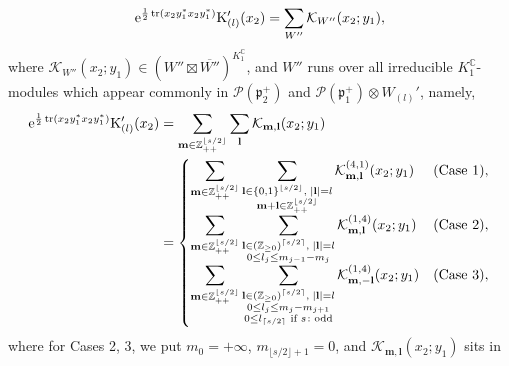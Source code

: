 \documentclass[pdftex]{sigma}
\numberwithin{equation}{section}
\newcommand{\ds}{\displaystyle}
\newcommand{\bl}{\mathbf{l}}
\newcommand{\bm}{\mathbf{m}}
\newcommand{\BZ}{\mathbb{Z}}
\newcommand{\BC}{\mathbb{C}}
\newcommand{\fp}{\mathfrak{p}}
\newcommand{\cK}{\mathcal{K}}
\newcommand{\cP}{\mathcal{P}}
\newcommand{\rK}{\mathrm{K}}
\newcommand{\tr}{\operatorname{tr}}
\begin{document}
\begin{gather*} {\rm e}^{\frac{1}{2}\tr(x_2y_1^*x_2y_1^*)}\rK_{(l)}'(x_2)=\sum_{W''} \cK_{W''}(x_2;y_1), \end{gather*}
where $\cK_{W''}(x_2;y_1)\in (W''\boxtimes \overline{W''})^{K_1^\BC}$, and $W''$ runs over all irreducible $K_1^\BC$-modules
which appear commonly in $\cP(\fp^+_2)$ and $\cP(\fp^+_1)\otimes W_{(l)}'$, namely,
\begin{align}
{\rm e}^{\frac{1}{2}\tr(x_2y_1^*x_2y_1^*)}\rK_{(l)}'(x_2)&=\sum_{\bm\in\BZ_{++}^{\lfloor s/2\rfloor}}\sum_\bl \cK_{\bm,\bl}(x_2;y_1) \notag \\
&=\begin{cases}
\ds \sum_{\bm\in\BZ_{++}^{\lfloor s/2\rfloor}}
\sum_{\substack{\bl\in\{0,1\}^{\lfloor s/2\rfloor},\; |\bl|=l\\ \bm+\bl\in\BZ_{++}^{\lfloor s/2\rfloor}}}
\cK_{\bm,\bl}^{(4,1)}(x_2;y_1) & (\text{Case }1), \\
\ds \sum_{\bm\in\BZ_{++}^{\lfloor s/2\rfloor}}
\sum_{\substack{\bl\in(\BZ_{\ge 0})^{\lceil s/2\rceil},\; |\bl|=l\\ 0\le l_j\le m_{j-1}-m_j}}
\cK_{\bm,\bl}^{(1,4)}(x_2;y_1) & (\text{Case }2), \\
\ds \sum_{\bm\in\BZ_{++}^{\lfloor s/2\rfloor}}
\sum_{\substack{\bl\in(\BZ_{\ge 0})^{\lceil s/2\rceil},\; |\bl|=l\\
0\le l_j\le m_j-m_{j+1}\\ 0\le l_{\lceil s/2\rceil} \text{ if }s\colon \text{odd}}}
\cK_{\bm,-\bl}^{(1,4)}(x_2;y_1) & (\text{Case }3),
\end{cases} \label{indexl}
\end{align}
where for Cases 2, 3, we put $m_0=+\infty$, $m_{\lfloor s/2\rfloor+1}=0$,
and $\cK_{\bm,\bl}(x_2;y_1)$ sits in
\end{document}
